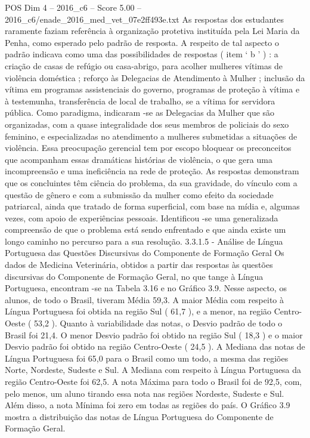 \begin{textsample}{POS Dim 4 – 2016\_c6 – Score 5.00 – 2016\_c6/enade\_2016\_med\_vet\_07e2ff493e.txt}
As respostas dos estudantes raramente faziam referência à organização protetiva instituída pela Lei Maria da Penha, como esperado pelo padrão de resposta.
A respeito de tal aspecto o padrão indicava como uma das possibilidades de respostas ( item ‘ b ’ ) : a criação de casas de refúgio ou casa-abrigo, para acolher mulheres vítimas de violência doméstica ; reforço às Delegacias de Atendimento à Mulher ; inclusão da vítima em programas assistenciais do governo, programas de proteção à vítima e à testemunha, transferência de local de trabalho, se a vítima for servidora pública.
Como paradigma, indicaram -se as Delegacias da Mulher que são organizadas, com a quase integralidade dos seus membros de policiais do sexo feminino, e especializadas no atendimento a mulheres submetidas a situações de violência.
Essa preocupação gerencial tem por escopo bloquear os preconceitos que acompanham essas dramáticas histórias de violência, o que gera uma incompreensão e uma ineficiência na rede de proteção.
As respostas demonstram que os concluintes têm ciência do problema, da sua gravidade, do vínculo com a questão de gênero e com a submissão da mulher como efeito da sociedade patriarcal, ainda que tratado de forma superficial, com base na mídia e, algumas vezes, com apoio de experiências pessoais.
Identificou -se uma generalizada compreensão de que o problema está sendo enfrentado e que ainda existe um longo caminho no percurso para a sua resolução. 3.3.1.5 - Análise de Língua Portuguesa das Questões Discursivas do Componente de Formação Geral Os dados de Medicina Veterinária, obtidos a partir das respostas às questões discursivas do Componente de Formação Geral, no que tange à Língua Portuguesa, encontram -se na Tabela 3.16 e no Gráfico 3.9.
Nesse aspecto, os alunos, de todo o Brasil, tiveram Média 59,3.
A maior Média com respeito à Língua Portuguesa foi obtida na região Sul ( 61,7 ), e a menor, na região Centro-Oeste ( 53,2 ).
Quanto à variabilidade das notas, o Desvio padrão de todo o Brasil foi 21,4.
O menor Desvio padrão foi obtido na região Sul ( 18,3 ) e o maior Desvio padrão foi obtido na região Centro-Oeste ( 24,5 ).
A Mediana das notas de Língua Portuguesa foi 65,0 para o Brasil como um todo, a mesma das regiões Norte, Nordeste, Sudeste e Sul.
A Mediana com respeito à Língua Portuguesa da região Centro-Oeste foi 62,5.
A nota Máxima para todo o Brasil foi de 92,5, com, pelo menos, um aluno tirando essa nota nas regiões Nordeste, Sudeste e Sul.
Além disso, a nota Mínima foi zero em todas as regiões do país.
O Gráfico 3.9 mostra a distribuição das notas de Língua Portuguesa do Componente de Formação Geral.

\end{textsample}
